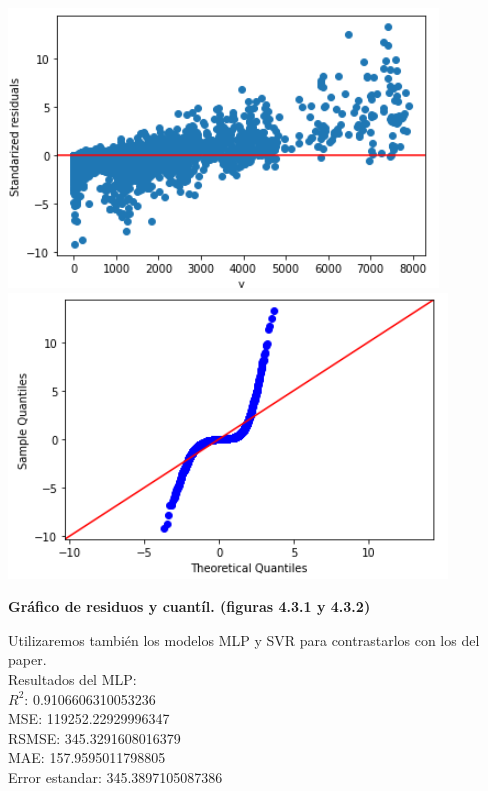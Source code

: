 \documentclass{article}
\begin{document}
    
            \includegraphics[scale=0.6]{images/residuos-discharge-randomforest1.PNG}
            \includegraphics[scale=0.6]{images/residuos-discharge-quantil1.PNG} \\
                    \begin{center}
                \textbf{Gráfico de residuos y cuantíl. (figuras 4.3.1 y 4.3.2)}
            \end{center}
    
    
    
        Utilizaremos también los modelos MLP y SVR para contrastarlos con los del paper.\\
            Resultados del MLP:\\
                $R^2$:  0.9106606310053236\\
                MSE:  119252.22929996347\\
                RSMSE:  345.3291608016379\\
                MAE:  157.9595011798805\\
                Error estandar:  345.3897105087386\\
                                                             
\end{document}
